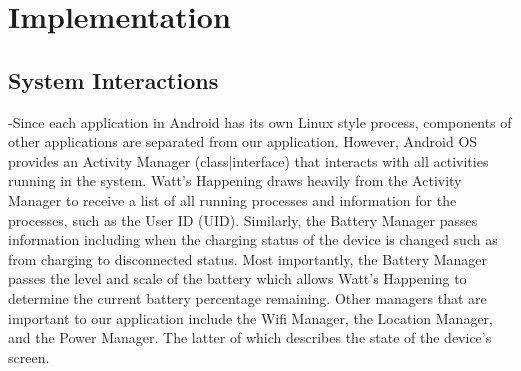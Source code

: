 \section*{Implementation}

\subsection*{System Interactions}
-Since each application in Android has its own Linux style process, components of other applications are separated from our application.  
However, Android OS provides an Activity Manager (class|interface) that interacts with all activities running in the system.  
Watt's Happening draws heavily from the Activity Manager to receive a list of all running processes and information for the processes, such as the User ID (UID).   
Similarly, the Battery Manager passes information including when the charging status of the 
device is changed such as from charging to disconnected status.  
Most importantly, the Battery Manager passes the level and scale of the battery which allows Watt's Happening to determine the current battery percentage remaining.  
Other managers that are important to our application include the Wifi Manager, the Location Manager, and the Power Manager.  
The latter of which describes the state of the device's screen. %

